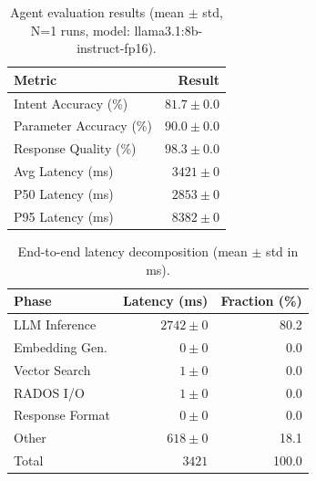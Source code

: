 
\begin{table}[t]
\centering
\caption{Agent evaluation results (mean $\pm$ std, N=1 runs, model: llama3.1:8b-instruct-fp16).}
\label{tab:eval-results}
\begin{tabular}{lr}
\toprule
\textbf{Metric} & \textbf{Result} \\
\midrule
Intent Accuracy (\%) & $81.7 \pm 0.0$ \\
Parameter Accuracy (\%) & $90.0 \pm 0.0$ \\
Response Quality (\%) & $98.3 \pm 0.0$ \\
\midrule
Avg Latency (ms) & $3421 \pm 0$ \\
P50 Latency (ms) & $2853 \pm 0$ \\
P95 Latency (ms) & $8382 \pm 0$ \\
\bottomrule
\end{tabular}
\end{table}


\begin{table}[t]
\centering
\caption{End-to-end latency decomposition (mean $\pm$ std in ms).}
\label{tab:latency-decomp}
\begin{tabular}{lrr}
\toprule
\textbf{Phase} & \textbf{Latency (ms)} & \textbf{Fraction (\%)} \\
\midrule
LLM Inference & $2742 \pm 0$ & 80.2 \\
Embedding Gen. & $0 \pm 0$ & 0.0 \\
Vector Search & $1 \pm 0$ & 0.0 \\
RADOS I/O & $1 \pm 0$ & 0.0 \\
Response Format & $0 \pm 0$ & 0.0 \\
Other & $618 \pm 0$ & 18.1 \\
\midrule
Total & $3421$ & 100.0 \\
\bottomrule
\end{tabular}
\end{table}
